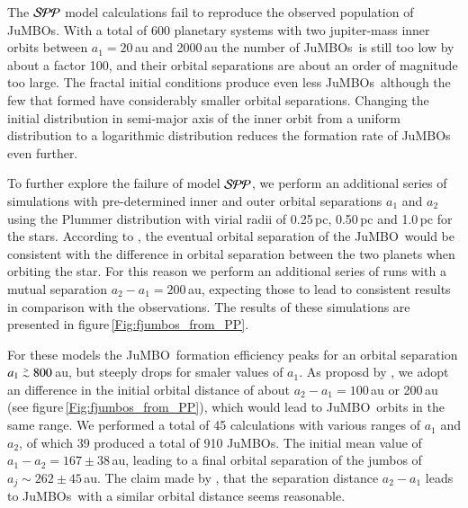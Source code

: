 \documentclass[aa]{lib/aa}
\def\apgt{\ {\raise-.5ex\hbox{$\buildrel>\over\sim$}}\ }
\newcommand{\jumbo}{\mbox{JuMBO}}
\newcommand{\jumbos}{\mbox{JuMBOs}}
\begin{document}
The ${\cal SPP}$ model calculations fail to reproduce the observed
population of \jumbos. With a total of 600 planetary systems with two
jupiter-mass inner orbits between $a_1=20$\,au and 2000\,au the number
of \jumbos\, is still too low by about a factor 100, and their orbital
separations are about an order of magnitude too large.  The fractal
initial conditions produce even less \jumbos\, although the few that
formed have considerably smaller orbital separations.  Changing the
initial distribution in semi-major axis of the inner orbit from a
uniform distribution to a logarithmic distribution reduces the
formation rate of \jumbos\, even further.

To further explore the failure of model ${\cal SPP}$, we perform an
additional series of simulations with pre-determined inner and outer
orbital separations $a_1$ and $a_2$ using the Plummer distribution
with virial radii of 0.25\,pc, 0.50\,pc and 1.0\,pc for the stars.
According to \cite{2023arXiv231006016W}, the eventual orbital
separation of the \jumbo\, would be consistent with the difference in
orbital separation between the two planets when orbiting the star. For
this reason we perform an additional series of runs with a mutual
separation $a_2-a_1 = 200$\,au, expecting those to lead to consistent
results in comparison with the observations.  The results of these
simulations are presented in figure\,\ref{Fig:fjumbos_from_PP}.

For these models the \jumbo\, formation efficiency peaks for an
orbital separation $a_1 \apgt 800$\,au, but steeply drops for smaler
values of $a_1$. As proposd by \cite{2023arXiv231006016W}, we adopt an
difference in the initial orbital distance of about $a_2-a_1 =
100$\,au or 200\,au (see figure\,\ref{Fig:fjumbos_from_PP}), which
would lead to \jumbo\, orbits in the same range.  We performed a total
of 45 calculations with various ranges of $a_1$ and $a_2$, of which 39
produced a total of 910 \jumbos. The initial mean value of $a_1-a_2 =
167\pm38$\,au, leading to a final orbital separation of the jumbos of
$a_j \sim 262\pm45$\,au.  The claim made by
\cite{2023arXiv231006016W}, that the separation distance $a_2-a_1$
leads to \jumbos\, with a similar orbital distance seems reasonable.
\end{document}

